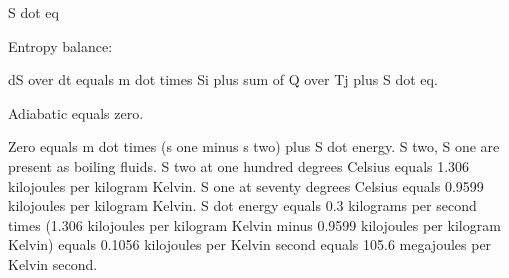 S dot eq

Entropy balance:

dS over dt equals m dot times Si plus sum of Q over Tj plus S dot eq.

Adiabatic equals zero.

Zero equals m dot times (s one minus s two) plus S dot energy. S two, S one are present as boiling fluids.
S two at one hundred degrees Celsius equals 1.306 kilojoules per kilogram Kelvin.
S one at seventy degrees Celsius equals 0.9599 kilojoules per kilogram Kelvin.
S dot energy equals 0.3 kilograms per second times (1.306 kilojoules per kilogram Kelvin minus 0.9599 kilojoules per kilogram Kelvin) equals 0.1056 kilojoules per Kelvin second equals 105.6 megajoules per Kelvin second.